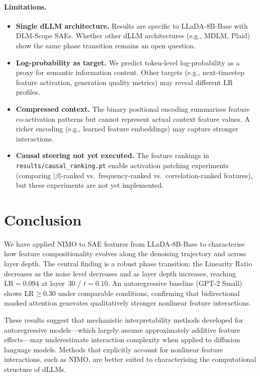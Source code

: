 \documentclass[11pt]{article}
\newcommand{\LR}{\mathrm{LR}}
\begin{document}
\paragraph{Limitations.}
\begin{itemize}
    \item \textbf{Single dLLM architecture.} Results are specific to LLaDA-8B-Base with DLM-Scope SAEs. Whether other dLLM architectures (e.g., MDLM, Plaid) show the same phase transition remains an open question.
    \item \textbf{Log-probability as target.} We predict token-level log-probability as a proxy for semantic information content. Other targets (e.g., next-timestep feature activation, generation quality metrics) may reveal different LR profiles.
    \item \textbf{Compressed context.} The binary positional encoding summarises feature co-activation patterns but cannot represent actual context feature values. A richer encoding (e.g., learned feature embeddings) may capture stronger interactions.
    \item \textbf{Causal steering not yet executed.} The feature rankings in \texttt{results/causal\_ranking.pt} enable activation patching experiments (comparing $|\beta|$-ranked vs.\ frequency-ranked vs.\ correlation-ranked features), but these experiments are not yet implemented.
\end{itemize}

\section{Conclusion}

We have applied NIMO to SAE features from LLaDA-8B-Base to characterise how feature compositionality evolves along the denoising trajectory and across layer depth.
The central finding is a robust phase transition: the Linearity Ratio decreases as the noise level decreases and as layer depth increases, reaching $\LR = 0.094$ at layer~30 / $t = 0.10$.
An autoregressive baseline (GPT-2 Small) shows $\LR \ge 0.30$ under comparable conditions, confirming that bidirectional masked attention generates qualitatively stronger nonlinear feature interactions.

These results suggest that mechanistic interpretability methods developed for autoregressive models---which largely assume approximately additive feature effects---may underestimate interaction complexity when applied to diffusion language models. Methods that explicitly account for nonlinear feature interactions, such as NIMO, are better suited to characterising the computational structure of dLLMs.
\end{document}
